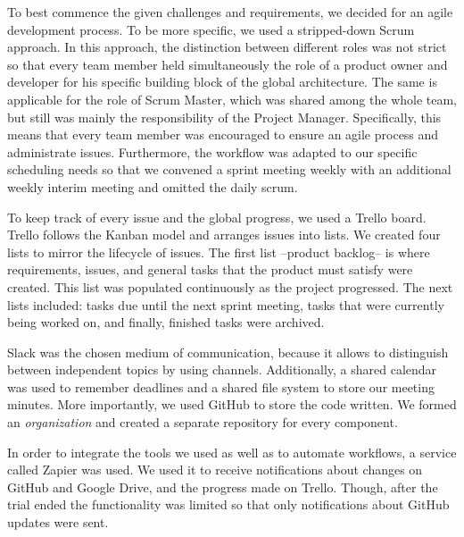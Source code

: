 To best commence the given challenges and requirements, we decided for
an agile development process. To be more specific, we used a
stripped-down Scrum approach. In this approach, the distinction between
different roles was not strict so that every team member held
simultaneously the role of a product owner and developer for his
specific building block of the global architecture. The same is
applicable for the role of Scrum Master, which was shared among the
whole team, but still was mainly the responsibility of the Project
Manager. Specifically, this means that every team member was encouraged
to ensure an agile process and administrate issues. Furthermore, the
workflow was adapted to our specific scheduling needs so that we convened a
sprint meeting weekly with an additional weekly interim meeting and
omitted the daily scrum.

To keep track of every issue and the global progress, we used a Trello board.
Trello follows the Kanban model and arranges issues into lists. We created
four lists to mirror the lifecycle of issues. The first list --product
backlog-- is where requirements, issues, and general tasks that the product
must satisfy were created. This list was populated continuously as the project
progressed. The next lists included: tasks due until the next sprint meeting,
tasks that were currently being worked on, and finally, finished tasks
were archived.

Slack was the chosen medium of communication, because it allows to
distinguish between independent topics by using channels. Additionally,
a shared calendar was used to remember deadlines and a shared file
system to store our meeting minutes. More importantly, we used
GitHub to store the code written. We formed an \emph{organization} and created
a separate repository for every component.

In order to integrate the tools we used as well as to automate
workflows, a service called Zapier was used. We used it to receive
notifications about changes on GitHub and Google Drive, and the progress
made on Trello. Though, after the trial ended the functionality was
limited so that only notifications about GitHub updates were sent.

